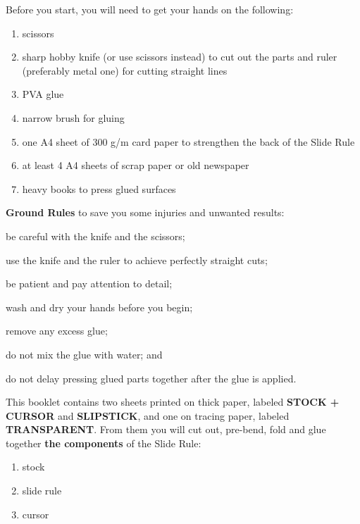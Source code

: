 \documentclass[a4paper,9pt]{article}
\begin{document}
  \begin{multicols*}{3}
  \normalsize{Before you start, you will need to get your hands on the following:
    \begin{enumerate}
      \setlength{\parskip}{0pt}
      \setlength{\parsep}{0pt}
      \item scissors
      \item sharp hobby knife (or use scissors instead) to cut out the parts and ruler (preferably metal one) for cutting straight lines
      \item PVA glue
      \item narrow brush for gluing
      \item one A4 sheet of 300 g/m card paper to strengthen the back of the Slide Rule
      \item at least 4 A4 sheets of scrap paper or old newspaper
      \item heavy books to press glued surfaces
    \end{enumerate}

  \textbf{Ground Rules} to save you some injuries and unwanted results:
    \begin{inparaenum}
      \item be careful with the knife and the scissors;
      \item use the knife and the ruler to achieve perfectly straight cuts;
      \item be patient and pay attention to detail;
      \item wash and dry your hands before you begin;
      \item remove any excess glue;
      \item do not mix the glue with water; and
      \item do not delay pressing glued parts together after the glue is applied.
    \end{inparaenum}

  This booklet contains two sheets printed on thick paper, labeled \textbf{STOCK + CURSOR} and \textbf{SLIPSTICK}, and one on tracing paper, labeled \textbf{TRANSPARENT}. From them you will cut out, pre-bend, fold and glue together \textbf{the components} of the Slide Rule:
    \begin{enumerate}
      \setlength{\parskip}{0pt}
      \setlength{\parsep}{0pt}
      \item stock
      \item slide rule
      \item cursor
    \end{enumerate}

}
\end{multicols*}
\end{document}

